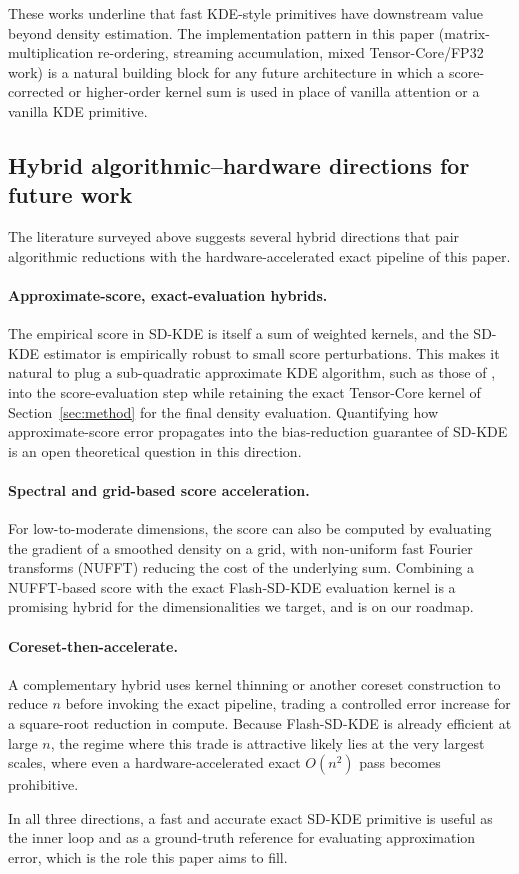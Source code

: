 These works underline that fast KDE-style primitives have downstream value
beyond density estimation.
The implementation pattern in this paper (matrix-multiplication
re-ordering, streaming accumulation, mixed Tensor-Core/FP32 work) is a
natural building block for any future architecture in which a
score-corrected or higher-order kernel sum is used in place of vanilla
attention or a vanilla KDE primitive.

\subsection{Hybrid algorithmic--hardware directions for future work}
\label{app:future_work}

The literature surveyed above suggests several hybrid directions that pair
algorithmic reductions with the hardware-accelerated exact pipeline of this
paper.

\paragraph{Approximate-score, exact-evaluation hybrids.}
The empirical score in SD-KDE is itself a sum of weighted kernels, and the
SD-KDE estimator is empirically robust to small score perturbations.
This makes it natural to plug a sub-quadratic approximate KDE algorithm,
such as those of
\citet{charikar2017hbe,backurs2019space,siminelakis2019rehashing,charikar2019multi,charikar2020kde},
into the score-evaluation step while retaining the exact Tensor-Core
kernel of Section~\ref{sec:method} for the final density evaluation.
Quantifying how approximate-score error propagates into the bias-reduction
guarantee of SD-KDE is an open theoretical question in this direction.

\paragraph{Spectral and grid-based score acceleration.}
For low-to-moderate dimensions, the score can also be computed by
evaluating the gradient of a smoothed density on a grid, with non-uniform
fast Fourier transforms (NUFFT) reducing the cost of the underlying sum.
Combining a NUFFT-based score with the exact Flash-SD-KDE evaluation kernel
is a promising hybrid for the dimensionalities we target, and is on our
roadmap.

\paragraph{Coreset-then-accelerate.}
A complementary hybrid uses kernel thinning
\citep{dwivedi2021kernel,shetty2022compress} or another coreset construction
to reduce $n$ before invoking the exact pipeline, trading a controlled
error increase for a square-root reduction in compute.
Because Flash-SD-KDE is already efficient at large $n$, the regime where
this trade is attractive likely lies at the very largest scales, where
even a hardware-accelerated exact $O(n^2)$ pass becomes prohibitive.

In all three directions, a fast and accurate exact SD-KDE primitive is
useful as the inner loop and as a ground-truth reference for evaluating
approximation error, which is the role this paper aims to fill.
